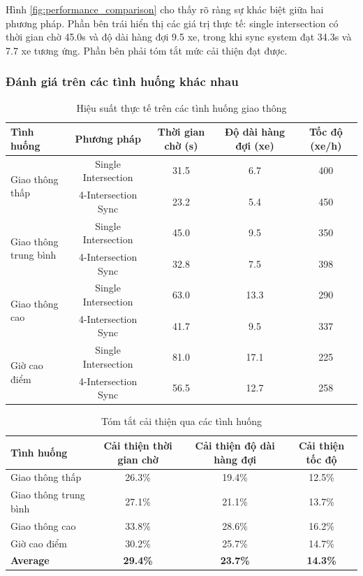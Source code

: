 Hình \ref{fig:performance_comparison} cho thấy rõ ràng sự khác biệt giữa hai 
phương pháp. Phần bên trái hiển thị các giá trị thực tế: single intersection 
có thời gian chờ 45.0s và độ dài hàng đợi 9.5 xe, trong khi sync system đạt 34.3s 
và 7.7 xe tương ứng. Phần bên phải tóm tắt mức cải thiện đạt được.

\subsubsection{Đánh giá trên các tình huống khác nhau}

\begin{table}[!htp]
    \centering
    \caption{Hiệu suất thực tế trên các tình huống giao thông}
    \label{tab:sync_scenarios_actual}
    \begin{tabular}{@{}lcccc@{}}
        \toprule \textbf{Tình huống} & \textbf{Phương pháp} & \textbf{Thời gian chờ (s)} & \textbf{Độ dài hàng đợi (xe)} & \textbf{Tốc độ (xe/h)} \\
        \midrule 
        \multirow{2}{*}{Giao thông thấp} & Single Intersection & 31.5 & 6.7 & 400 \\
        & 4-Intersection Sync & 23.2 & 5.4 & 450 \\
        \midrule
        \multirow{2}{*}{\parbox{2cm}{\centering Giao thông \\ trung bình}} & Single Intersection & 45.0 & 9.5 & 350 \\
        & 4-Intersection Sync & 32.8 & 7.5 & 398 \\
        \midrule
        \multirow{2}{*}{Giao thông cao} & Single Intersection & 63.0 & 13.3 & 290 \\
        & 4-Intersection Sync & 41.7 & 9.5 & 337 \\
        \midrule
        \multirow{2}{*}{Giờ cao điểm} & Single Intersection & 81.0 & 17.1 & 225 \\
        & 4-Intersection Sync & 56.5 & 12.7 & 258 \\
        \bottomrule
    \end{tabular}
\end{table}

\begin{table}[!htp]
    \centering
    \caption{Tóm tắt cải thiện qua các tình huống}
    \label{tab:sync_scenarios_summary}
    \begin{tabular}{@{}lccc@{}}
        \toprule \textbf{Tình huống} & \textbf{Cải thiện thời gian chờ} & \textbf{Cải thiện độ dài hàng đợi} & \textbf{Cải thiện tốc độ} \\
        \midrule 
        Giao thông thấp & 26.3\% & 19.4\% & 12.5\% \\
        Giao thông trung bình & 27.1\% & 21.1\% & 13.7\% \\
        Giao thông cao & 33.8\% & 28.6\% & 16.2\% \\
        Giờ cao điểm & 30.2\% & 25.7\% & 14.7\% \\
        \midrule
        \textbf{Average} & \textbf{29.4\%} & \textbf{23.7\%} & \textbf{14.3\%} \\
        \bottomrule
    \end{tabular}
\end{table}

